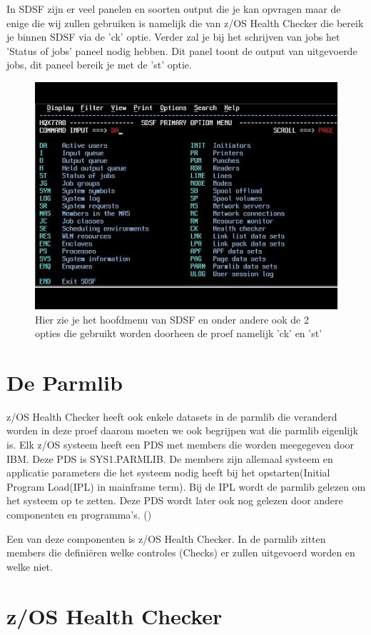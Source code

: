 In SDSF zijn er veel panelen en soorten output die je kan opvragen maar de enige die wij zullen gebruiken is namelijk die van z/OS Health Checker die bereik je binnen SDSF via de 'ck' optie. Verder zal je bij het schrijven van jobs het 'Status of jobs' paneel nodig hebben. Dit panel toont de output van uitgevoerde jobs, dit paneel bereik je met de 'st' optie.

\begin{figure}[h]
	\centering
	\includegraphics[width=0.7\linewidth]{img/SDSF}
	\caption[SDSF Hoofdmenu]{Hier zie je het hoofdmenu van SDSF en onder andere ook de 2 opties die gebruikt worden doorheen de proef namelijk 'ck' en 'st'}
	\label{fig:sdsf}
\end{figure}

 
\section{De Parmlib}
\label{sec:De Parmlib}

z/OS Health Checker heeft ook enkele datasets in de parmlib die veranderd worden in deze proef daarom moeten we ook begrijpen wat die parmlib eigenlijk is. Elk z/OS systeem heeft een PDS met members die worden meegegeven door IBM. Deze PDS is SYS1.PARMLIB. De members zijn allemaal systeem en applicatie parameters die het systeem nodig heeft bij het opstarten(Initial Program Load(IPL) in mainframe term). Bij de IPL wordt de parmlib gelezen om het systeem op te zetten. Deze PDS wordt later ook nog gelezen door andere componenten en programma's. (\cite{Cosimo2018})
 
Een van deze componenten is z/OS Health Checker. In de parmlib zitten members die definiëren welke controles (Checks) er zullen uitgevoerd worden en welke niet.
 
\section{z/OS Health Checker}
\label{sec:z/OS Health Checker}


